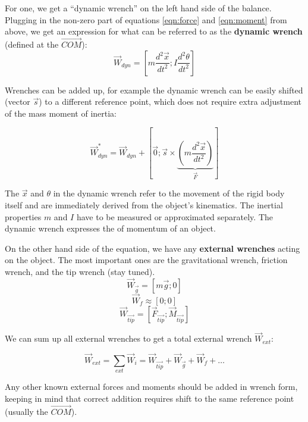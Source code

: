 For one, we get a ``dynamic wrench'' on the left hand side of the balance.
Plugging in the non-zero part of equations \eqref{eqn:force} and \eqref{eqn:moment} from above, we get an expression for what can be referred to as the \textbf{dynamic wrench} (defined at the \(\vec{COM}\)):
\begin{equation}\label{eqn:dynamic_wrench}
\vec{W}_{dyn} = \left[ m\frac{d^2\vec{x}}{dt^2}; I\frac{d^2\theta}{dt^2} \right]
\end{equation}

Wrenches can be added up, for example the dynamic wrench can be easily shifted (vector \(\vec{s}\)) to a different reference point, which does not require extra adjustment of the mass moment of inertia:
\begin{change}
\begin{equation}\label{eqn:shift_wrench}
\vec{W}_{dyn}^{*} = \vec{W}_{dyn} + [ \vec{0}; \vec{s} \times \underbrace{(m\frac{d^2\vec{x}}{dt^2})}_{\vec{F}} ]
\end{equation}
\end{change}



The \(\vec{x}\) and \(\theta\) in the dynamic wrench refer to the movement of the rigid body itself and are immediately derived from the object's kinematics.
The inertial properties \(m\) and \(I\) have to be measured or approximated separately.
The dynamic wrench expresses the  of momentum of an object.


On the other hand side of the equation, we have any \textbf{external wrenches} acting on the object.
The most important ones are the gravitational wrench, friction wrench, and the tip wrench (stay tuned).
\[\vec{W}_{\vec{g}} = \left[ m\vec{g}; 0 \right]\]
\[\vec{W}_{f} \approx \left[ 0; 0 \right]\]
\[\vec{W}_{\vec{tip}} = \left[ \vec{F}_{\vec{tip}}; \vec{M}_{\vec{tip}} \right]\]

We can sum up all external wrenches to get a total external wrench \(\vec{W}_{ext}\):
\begin{change}
\begin{equation}\label{eqn:external_wrench}
\vec{W}_{ext} = \sum\limits_{ext} \vec{W}_{i} = \vec{W}_{\vec{tip}} +\vec{W}_{\vec{g}}+\vec{W}_{f}+\ldots
\end{equation}
\end{change}

Any other known external forces and moments should be added in wrench form, keeping in mind that correct addition requires shift to the same reference point (usually the \(\vec{COM}\)).


